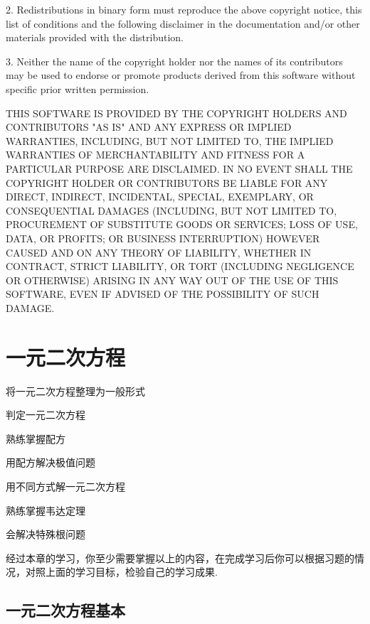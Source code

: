 \documentclass[lang=cn, 10pt, titlestyle=display, oneside, toc=twocol]{elegantbook}
\begin{document}
2. Redistributions in binary form must reproduce the above copyright notice,
   this list of conditions and the following disclaimer in the documentation
   and/or other materials provided with the distribution.

3. Neither the name of the copyright holder nor the names of its
   contributors may be used to endorse or promote products derived from
   this software without specific prior written permission.

THIS SOFTWARE IS PROVIDED BY THE COPYRIGHT HOLDERS AND CONTRIBUTORS "AS IS"
AND ANY EXPRESS OR IMPLIED WARRANTIES, INCLUDING, BUT NOT LIMITED TO, THE
IMPLIED WARRANTIES OF MERCHANTABILITY AND FITNESS FOR A PARTICULAR PURPOSE ARE
DISCLAIMED. IN NO EVENT SHALL THE COPYRIGHT HOLDER OR CONTRIBUTORS BE LIABLE
FOR ANY DIRECT, INDIRECT, INCIDENTAL, SPECIAL, EXEMPLARY, OR CONSEQUENTIAL
DAMAGES (INCLUDING, BUT NOT LIMITED TO, PROCUREMENT OF SUBSTITUTE GOODS OR
SERVICES; LOSS OF USE, DATA, OR PROFITS; OR BUSINESS INTERRUPTION) HOWEVER
CAUSED AND ON ANY THEORY OF LIABILITY, WHETHER IN CONTRACT, STRICT LIABILITY,
OR TORT (INCLUDING NEGLIGENCE OR OTHERWISE) ARISING IN ANY WAY OUT OF THE USE
OF THIS SOFTWARE, EVEN IF ADVISED OF THE POSSIBILITY OF SUCH DAMAGE.

\tableofcontents



\chapter{一元二次方程}



\begin{introduction}

\item 将一元二次方程整理为一般形式
\item 判定一元二次方程
\item 熟练掌握配方
\item 用配方解决极值问题
\item 用不同方式解一元二次方程
\item 熟练掌握韦达定理
\item 会解决特殊根问题

\end{introduction}

经过本章的学习，你至少需要掌握以上的内容，在完成学习后你可以根据习题的情况，对照上面的学习目标，检验自己的学习成果.

\section{一元二次方程基本}
\end{document}
